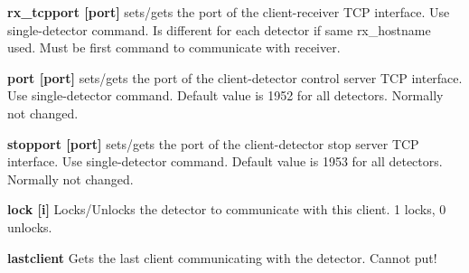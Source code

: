 \begin{DoxyItemize}
\item {\bfseries rx\_\-tcpport \mbox{[}port\mbox{]}} sets/gets the port of the client-\/receiver TCP interface. Use single-\/detector command. Is different for each detector if same {\ttfamily rx\_\-hostname} used. Must be first command to communicate with receiver.
\end{DoxyItemize}


\begin{DoxyItemize}
\item {\bfseries port \mbox{[}port\mbox{]}} sets/gets the port of the client-\/detector control server TCP interface. Use single-\/detector command. Default value is 1952 for all detectors. Normally not changed.
\end{DoxyItemize}


\begin{DoxyItemize}
\item {\bfseries stopport \mbox{[}port\mbox{]}} sets/gets the port of the client-\/detector stop server TCP interface. Use single-\/detector command. Default value is 1953 for all detectors. Normally not changed.
\end{DoxyItemize}


\begin{DoxyItemize}
\item {\bfseries lock \mbox{[}i\mbox{]}} Locks/Unlocks the detector to communicate with this client. 1 locks, 0 unlocks.
\end{DoxyItemize}


\begin{DoxyItemize}
\item {\bfseries lastclient } Gets the last client communicating with the detector. Cannot put! 
\end{DoxyItemize}